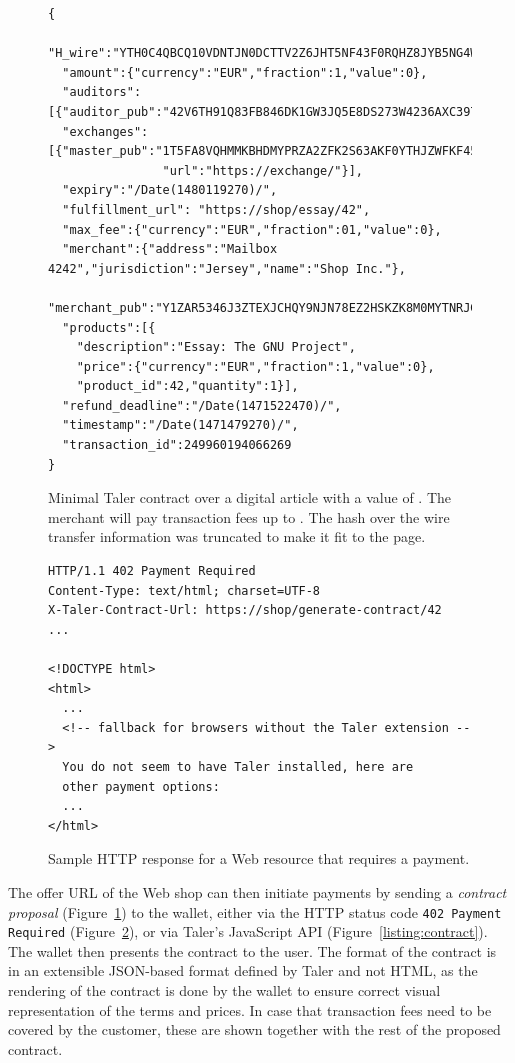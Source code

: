 \documentclass{llncs}
\begin{document}
\begin{figure}[t!]
  \lstset{language=JavaScript}
\begin{lstlisting}
{
  "H_wire":"YTH0C4QBCQ10VDNTJN0DCTTV2Z6JHT5NF43F0RQHZ8JYB5NG4W4G...",
  "amount":{"currency":"EUR","fraction":1,"value":0},
  "auditors":[{"auditor_pub":"42V6TH91Q83FB846DK1GW3JQ5E8DS273W4236AXC397892ESD0B0"}],
  "exchanges":[{"master_pub":"1T5FA8VQHMMKBHDMYPRZA2ZFK2S63AKF0YTHJZWFKF45K2JGC8H0",
                "url":"https://exchange/"}],
  "expiry":"/Date(1480119270)/",
  "fulfillment_url": "https://shop/essay/42",
  "max_fee":{"currency":"EUR","fraction":01,"value":0},
  "merchant":{"address":"Mailbox 4242","jurisdiction":"Jersey","name":"Shop Inc."},
  "merchant_pub":"Y1ZAR5346J3ZTEXJCHQY9NJN78EZ2HSKZK8M0MYTNRJG5N0HD520",
  "products":[{
    "description":"Essay: The GNU Project",
    "price":{"currency":"EUR","fraction":1,"value":0},
    "product_id":42,"quantity":1}],
  "refund_deadline":"/Date(1471522470)/",
  "timestamp":"/Date(1471479270)/",
  "transaction_id":249960194066269
}
\end{lstlisting}
  \caption{Minimal Taler contract over a digital article with a value of . The merchant will pay transaction fees up to .  The hash over the wire transfer information was truncated to make it fit to the page.}
  \label{listing:json-contract}
\end{figure}

\begin{figure}[t!]
\begin{lstlisting}
HTTP/1.1 402 Payment Required
Content-Type: text/html; charset=UTF-8
X-Taler-Contract-Url: https://shop/generate-contract/42
...

<!DOCTYPE html>
<html>
  ...
  <!-- fallback for browsers without the Taler extension -->
  You do not seem to have Taler installed, here are
  other payment options:
  ...
</html>
\end{lstlisting}
 \caption{Sample HTTP response for a Web resource that requires a payment.}
  \label{listing:http-contract}
\end{figure}

The offer URL of the Web shop can then initiate payments by sending a
\emph{contract proposal} (Figure~\ref{listing:json-contract}) to the wallet, either via the HTTP status
code {\tt 402 Payment Required} (Figure~\ref{listing:http-contract}), or via Taler's JavaScript API
(Figure~\ref{listing:contract}).  The wallet then presents the
contract to the user.  The format of the contract is in an extensible
JSON-based format defined by Taler and not HTML, as the rendering of
the contract is done by the wallet to ensure correct visual
representation of the terms and prices.  In case that transaction fees
need to be covered by the customer, these are shown together with the
rest of the proposed contract.
\end{document}
